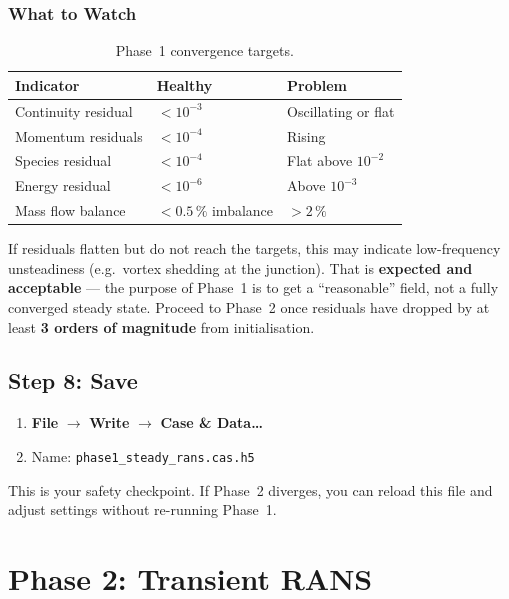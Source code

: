 \documentclass[12pt,a4paper]{report}
\begin{document}
\subsection{What to Watch}

\begin{table}[H]
\centering
\caption{Phase~1 convergence targets.}
\begin{tabular}{@{}lll@{}}
\toprule
\textbf{Indicator} & \textbf{Healthy} & \textbf{Problem} \\
\midrule
Continuity residual & $< 10^{-3}$ & Oscillating or flat \\
Momentum residuals  & $< 10^{-4}$ & Rising \\
Species residual    & $< 10^{-4}$ & Flat above $10^{-2}$ \\
Energy residual     & $< 10^{-6}$ & Above $10^{-3}$ \\
Mass flow balance   & $< 0.5\,\%$ imbalance & $> 2\,\%$ \\
\bottomrule
\end{tabular}
\end{table}

\noindent If residuals flatten but do not reach the targets, this may
indicate low-frequency unsteadiness (e.g.\ vortex shedding at the
junction).  That is \textbf{expected and acceptable} --- the purpose
of Phase~1 is to get a ``reasonable'' field, not a fully converged
steady state.  Proceed to Phase~2 once residuals have dropped by at
least \textbf{3 orders of magnitude} from initialisation.


\section{Step 8: Save}

\begin{enumerate}
  \item \textbf{File} $\rightarrow$ \textbf{Write} $\rightarrow$
        \textbf{Case \& Data\ldots}
  \item Name: \texttt{phase1\_steady\_rans.cas.h5}
\end{enumerate}

\noindent This is your safety checkpoint.  If Phase~2 diverges, you
can reload this file and adjust settings without re-running Phase~1.


\chapter{Phase 2: Transient RANS}
\label{ch:phase2}
\end{document}
